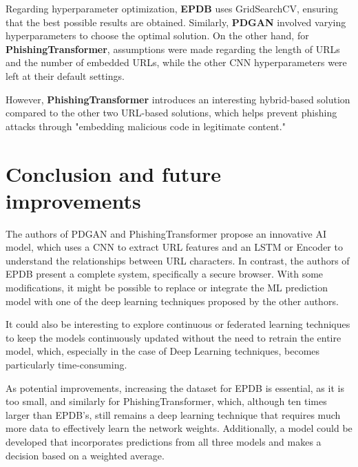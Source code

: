 Regarding hyperparameter optimization, \textbf{EPDB} uses GridSearchCV, ensuring that the best possible results are obtained. Similarly, \textbf{PDGAN} involved varying hyperparameters to choose the optimal solution. On the other hand, for \textbf{PhishingTransformer}, assumptions were made regarding the length of URLs and the number of embedded URLs, while the other CNN hyperparameters were left at their default settings.

However, \textbf{PhishingTransformer} introduces an interesting hybrid-based solution compared to the other two URL-based solutions, which helps prevent phishing attacks through "embedding malicious code in legitimate content."

\section{Conclusion and future improvements}
The authors of PDGAN and PhishingTransformer propose an innovative AI model, which uses a CNN to extract URL features and an LSTM or Encoder to understand the relationships between URL characters. In contrast, the authors of EPDB present a complete system, specifically a secure browser. With some modifications, it might be possible to replace or integrate the ML prediction model with one of the deep learning techniques proposed by the other authors.

It could also be interesting to explore continuous or federated learning techniques to keep the models continuously updated without the need to retrain the entire model, which, especially in the case of Deep Learning  techniques, becomes particularly time-consuming.

As potential improvements, increasing the dataset for EPDB is essential, as it is too small, and similarly for PhishingTransformer, which, although ten times larger than EPDB’s, still remains a deep learning technique that requires much more data to effectively learn the network weights. Additionally, a model could be developed that incorporates predictions from all three models and makes a decision based on a weighted average.